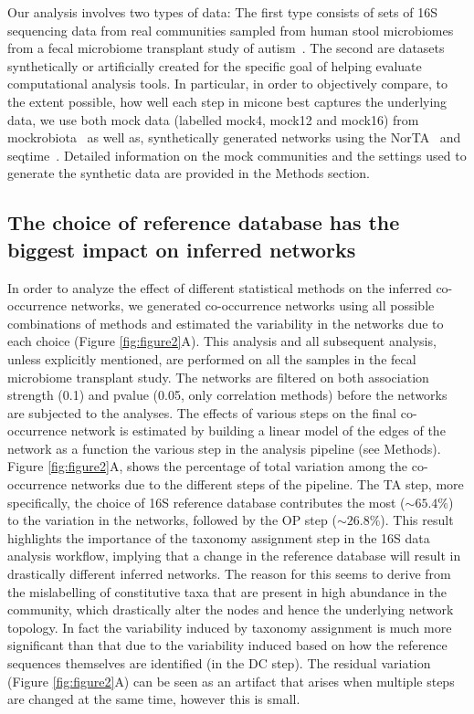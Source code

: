   Our analysis involves two types of data: The first type consists of sets of 16S sequencing data from real communities sampled from human stool microbiomes from a fecal microbiome transplant study of autism~\cite{Kang2017}.
  The second are datasets synthetically or artificially created for the specific goal of helping evaluate computational analysis tools.
  In particular, in order to objectively compare, to the extent possible, how well each step in \ac{micone} best captures the underlying data, we use both mock data (labelled mock4, mock12 and mock16) from mockrobiota~\cite{Bokulich2016} as well as, synthetically generated networks using the NorTA~\cite{Kurtz2015} and seqtime~\cite{Rottjers2018}.
  Detailed information on the mock communities and the settings used to generate the synthetic data are provided in the Methods section.

  \FloatBarrier

  \subsection*{The choice of reference database has the biggest impact on inferred networks}

  In order to analyze the effect of different statistical methods on the inferred co-occurrence networks, we generated co-occurrence networks using all possible combinations of methods and estimated the variability in the networks due to each choice (Figure \ref{fig:figure2}A).
  This analysis and all subsequent analysis, unless explicitly mentioned, are performed on all the samples in the fecal microbiome transplant study.
  The networks are filtered on both association strength (0.1) and pvalue (0.05, only correlation methods) before the networks are subjected to the analyses.
  The effects of various steps on the final co-occurrence network is estimated by building a linear model of the edges of the network as a function the various step in the analysis pipeline (see Methods).
  Figure \ref{fig:figure2}A, shows the percentage of total variation among the co-occurrence networks due to the different steps of the pipeline.
  The TA step, more specifically, the choice of 16S reference database contributes the most ($\sim65.4\%$) to the variation in the networks, followed by the OP step ($\sim26.8\%$).
  This result highlights the importance of the taxonomy assignment step in the 16S data analysis workflow, implying that a change in the reference database will result in drastically different inferred networks.
  The reason for this seems to derive from the mislabelling of constitutive taxa that are present in high abundance in the community, which drastically alter the nodes and hence the underlying network topology.
  In fact the variability induced by taxonomy assignment is much more significant than that due to the variability induced based on how the reference sequences themselves are identified (in the DC step).
  The residual variation (Figure \ref{fig:figure2}A) can be seen as an artifact that arises when multiple steps are changed at the same time, however this is small.

